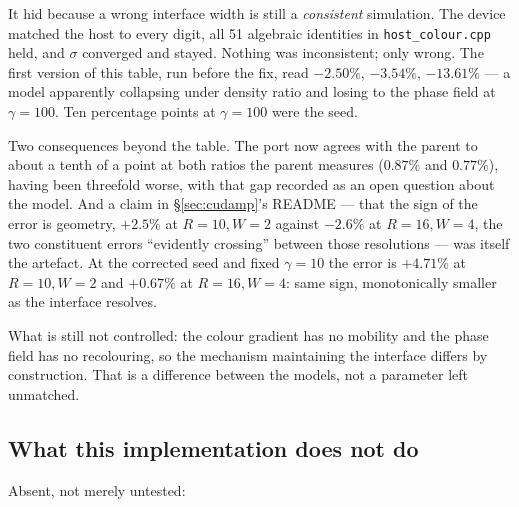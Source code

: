 \documentclass[11pt,a4paper]{article}
\newcommand{\code}[1]{\texttt{\small #1}}
\begin{document}
It hid because a wrong interface width is still a \emph{consistent} simulation.
The device matched the host to every digit, all 51 algebraic identities in
\code{host\_colour.cpp} held, and $\sigma$ converged and stayed. Nothing was
inconsistent; only wrong. The first version of this table, run before the fix,
read $-2.50\%$, $-3.54\%$, $-13.61\%$ --- a model apparently collapsing under
density ratio and losing to the phase field at $\gamma = 100$. Ten percentage
points at $\gamma = 100$ were the seed.

Two consequences beyond the table. The port now agrees with the parent to about
a tenth of a point at both ratios the parent measures ($0.87\%$ and $0.77\%$),
having been threefold worse, with that gap recorded as an open question about
the model. And a claim in \S\ref{sec:cudamp}'s README --- that the sign of the
error is geometry, $+2.5\%$ at $R = 10, W = 2$ against $-2.6\%$ at
$R = 16, W = 4$, the two constituent errors ``evidently crossing'' between those
resolutions --- was itself the artefact. At the corrected seed and fixed
$\gamma = 10$ the error is $+4.71\%$ at $R = 10, W = 2$ and $+0.67\%$ at
$R = 16, W = 4$: same sign, monotonically smaller as the interface resolves.

What is still not controlled: the colour gradient has no mobility and the phase
field has no recolouring, so the mechanism maintaining the interface differs by
construction. That is a difference between the models, not a parameter left
unmatched.

\subsection{What this implementation does not do}

Absent, not merely untested:
\end{document}
